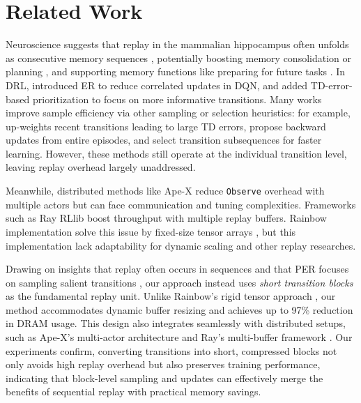 \documentclass[10pt]{article} %
\begin{document}
\section{Related Work}
Neuroscience suggests that replay in the mammalian hippocampus often unfolds as consecutive memory sequences \citep{ReverseReplayBehavioural_foster_2006}, potentially boosting memory consolidation or planning \citep{HippocampalPlaceCells_olafsdottir_2015}, and supporting memory functions like preparing for future tasks \citep{TheoryHippocampalFunction_rolls_2024}.
In DRL, \citet{HumanlevelControlDeep_mnih_2015} introduced ER to reduce correlated updates in DQN, and \citet{PrioritizedExperienceReplay_schaul_2016} added TD-error-based prioritization to focus on more informative transitions.
Many works improve sample efficiency via other sampling or selection heuristics: for example, \citet{PrioritizedSequenceExperience_brittain_2020} up-weights recent transitions leading to large TD errors,
\citet{SampleEfficientDeepReinforcement_lee_2019} propose backward updates from entire episodes, and \citet{SelfOrganizingMapsStorage_karimpanal_2018} select transition subsequences for faster learning.
However, these methods still operate at the individual transition level, leaving replay overhead largely unaddressed.

Meanwhile, distributed methods like Ape-X \citep{DistributedPrioritizedExperience_horgan_2018} reduce \texttt{Observe} overhead with multiple actors but can face communication and tuning complexities.
Frameworks such as Ray RLlib \citep{RayDistributedFramework_moritz_2018} boost throughput with multiple replay buffers.
Rainbow implementation solve this issue by fixed-size tensor arrays \citep{CurtParkRainbowisallyouneed_parkcurt_2024}, but this implementation lack adaptability for dynamic scaling \citep{RLx2TrainingSparse_tan_2023} and other replay researches.

Drawing on insights that replay often occurs in sequences \citep{ReverseReplayBehavioural_foster_2006, ReplayCorticalSpiking_vaz_2020} and that PER focuses on sampling salient transitions \citep{PrioritizedExperienceReplay_schaul_2016}, our approach instead uses \emph{short transition blocks} as the fundamental replay unit.  
Unlike Rainbow’s rigid tensor approach \citep{CurtParkRainbowisallyouneed_parkcurt_2024}, our method accommodates dynamic buffer resizing and achieves up to 97\% reduction in DRAM usage.
This design also integrates seamlessly with distributed setups, such as Ape-X’s multi-actor architecture \citep{DistributedPrioritizedExperience_horgan_2018} and Ray’s multi-buffer framework \citep{RayprojectRlexperiments_ray_2022}. 
Our experiments confirm, converting transitions into short, compressed blocks not only avoids high replay overhead but also preserves training performance, indicating that block-level sampling and updates can effectively merge the benefits of sequential replay with practical memory savings.
\end{document}
